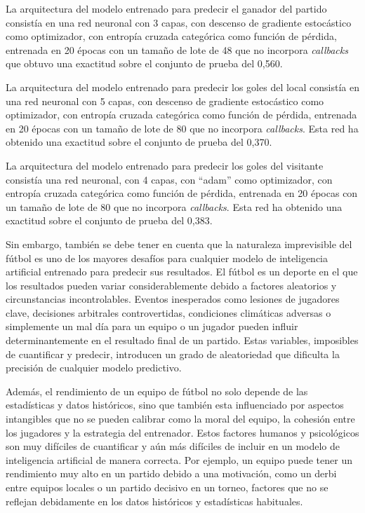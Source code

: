 La arquitectura del modelo entrenado para predecir el ganador del partido consistía en una red neuronal con 3 capas, con descenso de gradiente
estocástico como optimizador, con entropía cruzada categórica como función de pérdida,
entrenada en 20 épocas con un tamaño de lote de 48 que no incorpora \textit{callbacks} que obtuvo una exactitud sobre el conjunto de prueba del 0,560.

La arquitectura del modelo entrenado para predecir los goles del local consistía en una red neuronal  con 5 capas, con descenso de gradiente
estocástico como optimizador, con entropía cruzada categórica como función de pérdida,
entrenada en 20 épocas con un tamaño de lote de 80 que no incorpora \textit{callbacks}. Esta red ha
obtenido una exactitud sobre el conjunto de prueba del 0,370.

La arquitectura del modelo entrenado para predecir los goles del visitante consistía una red neuronal,  con 4 capas, con ``adam'' como optimizador,
con entropía cruzada categórica como función de pérdida, entrenada en 20 épocas con un tamaño
de lote de 80 que no incorpora \textit{callbacks}. Esta red ha obtenido una exactitud sobre el conjunto
de prueba del 0,383.

Sin embargo, también se debe tener en cuenta que la naturaleza imprevisible del fútbol es uno de los mayores desafíos para cualquier modelo de inteligencia artificial entrenado para predecir sus resultados. El fútbol es un deporte en el que los resultados pueden variar considerablemente debido a factores aleatorios y circunstancias incontrolables. Eventos inesperados como lesiones de jugadores clave, decisiones arbitrales controvertidas, condiciones climáticas adversas o simplemente un mal día para un equipo o un jugador pueden influir determinantemente en el resultado final de un partido. Estas variables, imposibles de cuantificar y predecir, introducen un grado de aleatoriedad que dificulta la precisión de cualquier modelo predictivo.

Además, el rendimiento de un equipo de fútbol no solo depende de las estadísticas y datos históricos, sino que también esta influenciado por aspectos intangibles que no se pueden calibrar como la moral del equipo, la cohesión entre los jugadores y la estrategia del entrenador. Estos factores humanos y psicológicos son muy difíciles de cuantificar y aún más difíciles de incluir en un modelo de inteligencia artificial de manera correcta. Por ejemplo, un equipo puede tener un rendimiento muy alto en un partido debido a una motivación, como un derbi entre equipos locales o un partido decisivo en un torneo, factores que no se reflejan debidamente en los datos históricos y estadísticas habituales.

